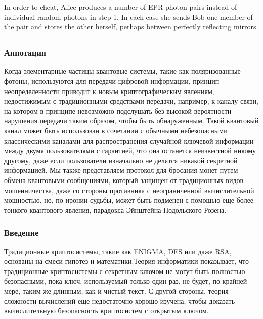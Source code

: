 In order to cheat, Alice produces a number of EPR photon-pairs instead of individual random pho­tons in step 1. In each case she sends Bob one mem­ber of the pair and stores the other herself, per­haps between perfectly reflecting mirrors. 


\subsection{\trnas}

\subsubsection*{Аннотация}
Когда элементарные частицы квантовые системы, такие как поляризованные фотоны, используются для передачи цифровой информации, принцип неопределенности приводит к новым криптографическим явлениям, недостижимым с традиционными средствами передачи, например, к каналу связи, на котором в принципе невозможно подслушать без высокой вероятности нарушения передачи таким образом, чтобы быть обнаруженным. Такой квантовый канал может быть использован в сочетании с обычными небезопасными классическими каналами для распространения случайной ключевой информации между двумя пользователями с гарантией, что она останется неизвестной никому другому, даже если пользователи изначально не делятся никакой секретной информацией. Мы также представляем протокол для бросания монет путем обмена квантовыми сообщениями, который защищен от традиционных видов мошенничества, даже со стороны противника с неограниченной вычислительной мощностью, но, по иронии судьбы, может быть подменен с помощью еще более тонкого квантового явления, парадокса Эйнштейна-Подольского-Розена.

\subsubsection{Введение}

­­Традиционные криптосистемы, такие как ENIGMA, DES или даже RSA, основаны на смеси гипотез и математики.Теория информатики показывает, что традиционные криптосистемы с секретным ключом не могут быть полностью безопасными, пока ключ, используемый только один раз, не будет, по крайней мере, таким же длинным, как и чистый текст. С другой стороны, теория сложности вычислений еще недостаточно хорошо изучена, чтобы доказать вычислительную безопасность криптосистем с открытым ключом.

